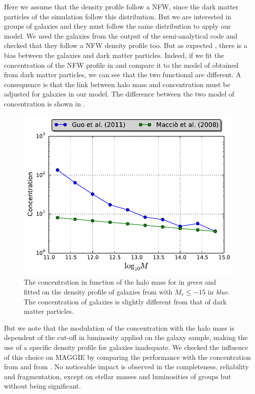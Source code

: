 Here we assume that the density profile follow a NFW, since the dark matter
particles of the \citet{Borgani+04} simulation follow this distribution. But we
are interested in groups of galaxies and they must follow the same distribution
to apply our model. We used the galaxies from the output of the \citet{Guo+11}
semi-analytical code and checked that they follow a NFW density profile too.
But as expected , there is a bias between the
galaxies and dark matter particles. Indeed, if we fit the concentration of the
NFW profile in \citet{Guo+11} and compare it to the model of \citet{Maccio+08}
obtained from dark matter particles, we can see that the two functional are
different. A consequence is that the link between halo mass and concentration
must be adjusted for galaxies in our model. The difference between the two
model of concentration is shown in .
%
\begin{figure}[ht]
    \centering
    \includegraphics[width=0.8\linewidth]{figures/maggie/concentrations.pdf}
    \caption{The concentration in function of the halo mass for
        \citet{Maccio+08} in \emph{green} and fitted on the \citet{NFW+97}
        density profile of galaxies from \citet{Guo+11} with $M_r\leqslant-15$
        in \emph{blue}. The concentration of galaxies is slightly different
    from that of dark matter particles.\label{fig:concentration_bias}}
\end{figure}
%
But we note that the modulation of the concentration with the halo mass is
dependent of the cut-off in luminosity applied on the galaxy sample, making the
use of a specific density profile for galaxies inadequate. We checked the
influence of this choice on MAGGIE by comparing the performance with the
concentration from \citet{Guo+11} and from \citet{Maccio+08}. No noticeable
impact is observed in the completeness, reliability and fragmentation, except
on stellar masses and luminosities of groups but without being significant.

